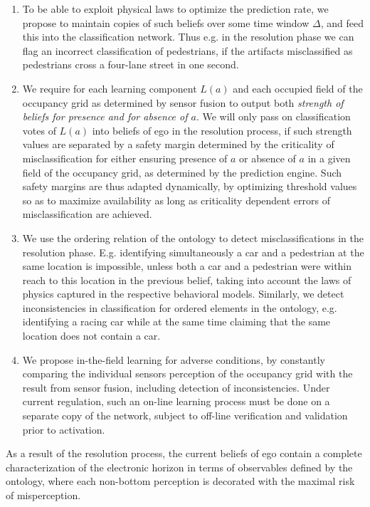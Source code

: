 \begin{enumerate}
\item To be able to exploit physical laws to optimize the prediction rate, we propose to maintain copies of such beliefs over some time window $\Delta$, and feed this into the classification network. Thus e.g. in the resolution phase we can flag an incorrect classification of pedestrians, if the artifacts misclassified as pedestrians cross a four-lane street in one second.
\item We require for each learning component $L(a)$ and each occupied field of the occupancy grid as determined by sensor fusion to output both \emph{strength of beliefs for presence and for absence of $a$}. We will only pass on classification votes of $L(a)$ into beliefs of ego in the resolution process, if such strength values are separated by a safety margin determined by the criticality of misclassification for either ensuring presence of $a$ or absence of $a$ in a given field of the occupancy grid, as determined by the prediction engine. Such safety margins are thus adapted dynamically, by optimizing threshold values so as to maximize availability as long as criticality dependent errors of misclassification are achieved.
\item We use the ordering relation of the ontology to detect misclassifications in the resolution phase. E.g. identifying simultaneously a car and a pedestrian at the same location is impossible, unless both a car and a pedestrian were within reach to this location in the previous belief, taking into account the laws of physics captured in the respective behavioral models. Similarly, we detect inconsistencies in classification for ordered elements in the ontology, e.g. identifying a racing car while at the same time claiming that the same location does not contain a car.
\item We propose in-the-field learning for adverse conditions, by constantly comparing the individual sensors perception of the occupancy grid with the result from sensor fusion, including detection of inconsistencies. Under current regulation, such an on-line learning process must be done on a separate copy of the network, subject to off-line verification and validation prior to activation.
\end{enumerate}

As a result of the resolution process, the current beliefs of ego contain a complete characterization of the electronic horizon in terms of observables defined by the ontology, where each non-bottom perception is decorated with the maximal risk of misperception.

